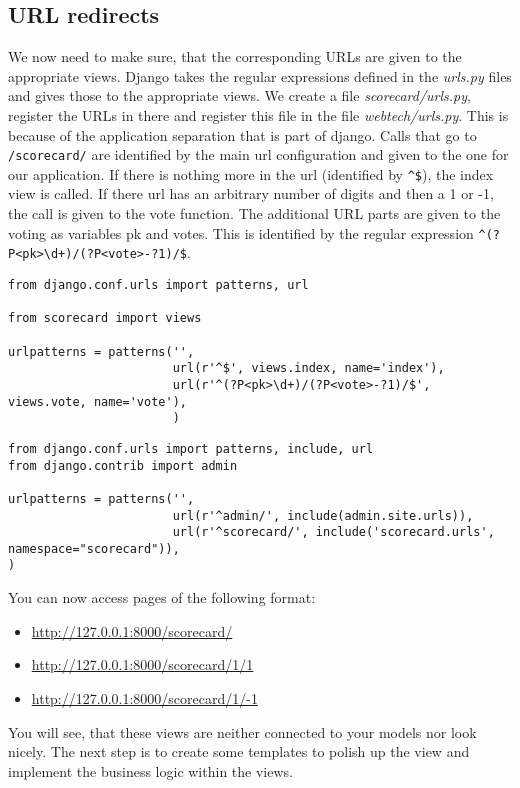 \subsection{URL redirects}
We now need to make sure, that the corresponding URLs are given to the appropriate views. Django takes the regular expressions defined in the \emph{urls.py} files and gives those to the appropriate views. We create a file \emph{scorecard/urls.py}, register the URLs in there and register this file in the file \emph{webtech/urls.py}. This is because of the application separation that is part of django. Calls that go to \lstinline|/scorecard/| are identified by the main url configuration and given to the one for our application. If there is nothing more in the url (identified by \lstinline|^$|), the index view is called. If there url has an arbitrary number of digits and then a 1 or -1, the call is given to the vote function. The additional URL parts are given to the voting as variables pk and votes. This is identified by the regular expression \lstinline|^(?P<pk>\d+)/(?P<vote>-?1)/$|.
\begin{lstlisting}[style=Python, caption=scorecard/urls.py, label=lst:scorecard_urls.py]
from django.conf.urls import patterns, url

from scorecard import views

urlpatterns = patterns('',
                       url(r'^$', views.index, name='index'),
                       url(r'^(?P<pk>\d+)/(?P<vote>-?1)/$', views.vote, name='vote'),
                       )
\end{lstlisting}

\begin{lstlisting}[style=Python, caption=webtech/urls.py, label=lst:webtech_urls.py]
from django.conf.urls import patterns, include, url
from django.contrib import admin

urlpatterns = patterns('',
                       url(r'^admin/', include(admin.site.urls)),
                       url(r'^scorecard/', include('scorecard.urls', namespace="scorecard")),
)
\end{lstlisting}

You can now access pages of the following format:
\begin{itemize}
 \item \url{http://127.0.0.1:8000/scorecard/}
 \item \url{http://127.0.0.1:8000/scorecard/1/1}
 \item \url{http://127.0.0.1:8000/scorecard/1/-1}
\end{itemize}

You will see, that these views are neither connected to your models nor look nicely. The next step is to create some templates to polish up the view and implement the business logic within the views.